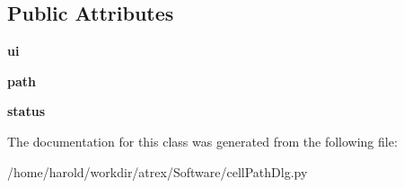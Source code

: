 \subsection*{Public Attributes}
\begin{DoxyCompactItemize}
\item 
\hypertarget{classcellPathDlg_1_1cellPathDlg_af004a0758946e90d601ec2180453c60a}{{\bfseries ui}}\label{classcellPathDlg_1_1cellPathDlg_af004a0758946e90d601ec2180453c60a}

\item 
\hypertarget{classcellPathDlg_1_1cellPathDlg_a0a857af36f6583033648fb23a8369c00}{{\bfseries path}}\label{classcellPathDlg_1_1cellPathDlg_a0a857af36f6583033648fb23a8369c00}

\item 
\hypertarget{classcellPathDlg_1_1cellPathDlg_adf6303625eb528b1432bf7913b2866ee}{{\bfseries status}}\label{classcellPathDlg_1_1cellPathDlg_adf6303625eb528b1432bf7913b2866ee}

\end{DoxyCompactItemize}


The documentation for this class was generated from the following file\-:\begin{DoxyCompactItemize}
\item 
/home/harold/workdir/atrex/\-Software/cell\-Path\-Dlg.\-py\end{DoxyCompactItemize}
